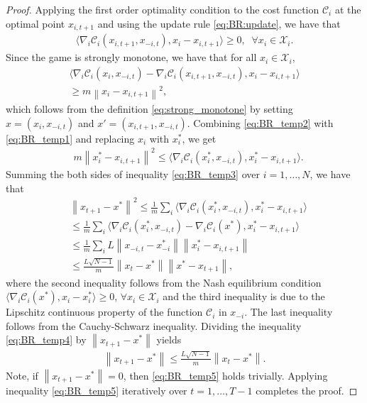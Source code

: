 \begin{proof}
Applying the first order optimality condition to the cost function $\mathcal{C}_i$  at the optimal point $x_{i,t+1}$ and using the update rule \eqref{eq:BR:update}, we have that
%
\begin{align}\label{eq:BR_temp1}
    \langle \nabla_i \mathcal{C}_i (x_{i,t+1},x_{-i,t}),x_i - x_{i,t+1} \rangle \geq 0, \; \; \forall x_i \in \mathcal{X}_i.
\end{align}
%
Since the game is strongly monotone, we have that for all $x_i \in \mathcal{X}_i$,
\begin{align}\label{eq:BR_temp2}
    \langle \nabla_i \mathcal{C}_i (x_{i},x_{-i,t})- \nabla_i \mathcal{C}_i (x_{i,t+1},x_{-i,t}), x_i - x_{i,t+1} \rangle  \nonumber \\
    \geq m \left\| x_i -x_{i,t+1} \right\|^2,
\end{align}
%
which follows from the definition \eqref{eq:strong_monotone} by setting $x=(x_{i},x_{-i,t})$ and $x'=(x_{i,t+1},x_{-i,t})$.
Combining \eqref{eq:BR_temp2} with \eqref{eq:BR_temp1} and replacing $x_i$ with $x_i^{*}$, we get
\begin{align}\label{eq:BR_temp3}
    &m \left\| x_i^{*} -x_{i,t+1} \right\|^2  
    \leq  \langle \nabla_i \mathcal{C}_i (x_{i}^{*},x_{-i,t}) , x_i^{*} - x_{i,t+1} \rangle .
\end{align}
Summing the both sides of inequality \eqref{eq:BR_temp3} over $i=1,\ldots,N$, we have that
%
\begin{align}\label{eq:BR_temp4}
    & \left\| x_{t+1} - x^{*} \right\|^2 
    \leq  \frac{1}{m} \sum_i \langle \nabla_i \mathcal{C}_i (x_{i}^{*},x_{-i,t}) , x_i^{*} - x_{i,t+1} \rangle \nonumber \\
    & \leq  \frac{1}{m} \sum_i \langle \nabla_i \mathcal{C}_i (x_{i}^{*},x_{-i,t}) - \nabla_i \mathcal{C}_i (x^{*}) , x_i^{*} - x_{i,t+1} \rangle \nonumber \\
    & \leq   \frac{1}{m} \sum_i L \left\| x_{-i,t} - x_{-i}^{*}\right\| \left\| x_{i}^{*} - x_{i,t+1}\right\| \nonumber \\
   & \leq   \frac{L\sqrt{N-1}}{m}   \left\| x_{t} - x^{*}\right\| \left\| x^{*} - x_{t+1}\right\|,
\end{align}
%
where the second inequality follows from the Nash equilibrium condition $\langle \nabla_i \mathcal{C}_i (x^{*}),x_i - x_{i}^{*} \rangle \geq 0 $, $\forall x_i \in \mathcal{X}_i$ and the third inequality is due to the Lipschitz continuous property of the function $\mathcal{C}_i$ in $x_{-i}$.
The last inequality follows from the Cauchy-Schwarz inequality.
Dividing the inequality \eqref{eq:BR_temp4} by $\left\| x_{t+1} - x^{*} \right\|$ yields 
\begin{align}\label{eq:BR_temp5}
    \left\| x_{t+1} - x^{*} \right\| \leq \frac{L \sqrt{N-1}}{m}\left\| x_{t} - x^{*} \right\|.
\end{align}
Note, if $\left\| x_{t+1} - x^{*} \right\| = 0$, then \eqref{eq:BR_temp5} holds trivially. Applying inequality \eqref{eq:BR_temp5} iteratively over $t=1,\ldots,T-1$ completes the proof.
\end{proof}
